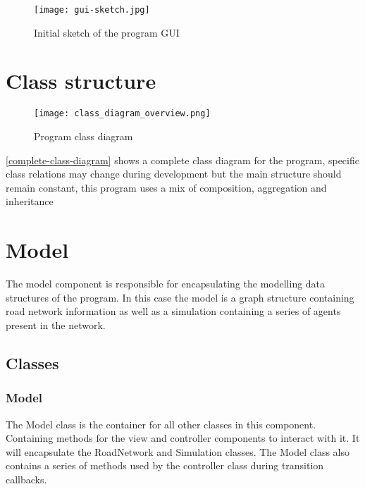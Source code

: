     \begin{figure}
        \centering
        \texttt{[image: gui-sketch.jpg]}
        \caption{Initial sketch of the program GUI}
        \label{design:gui-sketch}
    \end{figure}

    \clearpage

\section{Class structure}

    \begin{figure}
        \centering
        \texttt{[image: class\_diagram\_overview.png]}
        \caption{Program class diagram}
        \label{complete-class-diagram}
    \end{figure}

    \autoref{complete-class-diagram} shows a complete class diagram for the program, specific class relations may change during development but the main structure should remain constant, this program uses a mix of composition, aggregation and inheritance

\section{Model}

    The model component is responsible for encapsulating the modelling data structures of the program. In this case the model is a graph structure containing road network information as well as a simulation containing a series of agents present in the network.

    \subsection{Classes}

        \subsubsection{Model}

            The Model class is the container for all other classes in this component. Containing methods for the view and controller components to interact with it. It will encapsulate the RoadNetwork and Simulation classes. The Model class also contains a series of methods used by the controller class during transition callbacks.


